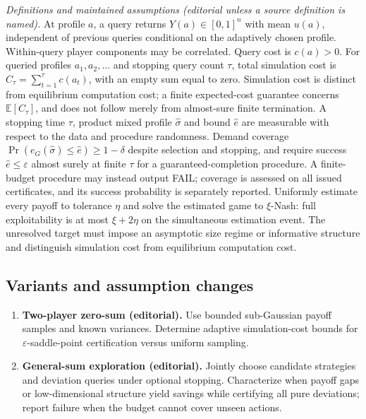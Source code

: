 \documentclass[11pt,a4paper]{article}
\newcommand{\E}{\mathbb E}
\begin{document}
\emph{Definitions and maintained assumptions (editorial unless a source definition is named).} At profile \(a\), a query returns \(Y(a)\in[0,1]^n\) with mean \(u(a)\), independent of previous queries conditional on the adaptively chosen profile. Within-query player components may be correlated. Query cost is \(c(a)>0\). For queried profiles \(a_1,a_2,\ldots\) and stopping query count \(\tau\), total simulation cost is \(C_\tau=\sum_{t=1}^{\tau}c(a_t)\), with an empty sum equal to zero. Simulation cost is distinct from equilibrium computation cost; a finite expected-cost guarantee concerns \(\E[C_\tau]\), and does not follow merely from almost-sure finite termination. A stopping time \(\tau\), product mixed profile \(\widehat\sigma\) and bound \(\widehat e\) are measurable with respect to the data and procedure randomness. Demand coverage \(\Pr(e_G(\widehat\sigma)\le\widehat e)\ge1-\delta\) despite selection and stopping, and require success \(\widehat e\le\varepsilon\) almost surely at finite \(\tau\) for a guaranteed-completion procedure. A finite-budget procedure may instead output FAIL; coverage is assessed on all issued certificates, and its success probability is separately reported. Uniformly estimate every payoff to tolerance \(\eta\) and solve the estimated game to \(\xi\)-Nash: full exploitability is at most \(\xi+2\eta\) on the simultaneous estimation event. The unresolved target must impose an asymptotic size regime or informative structure and distinguish simulation cost from equilibrium computation cost.
\subsection*{Variants and assumption changes}
\begin{enumerate}
\item \textbf{Two-player zero-sum (editorial).} Use bounded sub-Gaussian payoff samples and known variances. Determine adaptive simulation-cost bounds for \(\varepsilon\)-saddle-point certification versus uniform sampling.
\item \textbf{General-sum exploration (editorial).} Jointly choose candidate strategies and deviation queries under optional stopping. Characterize when payoff gaps or low-dimensional structure yield savings while certifying all pure deviations; report failure when the budget cannot cover unseen actions.
\end{enumerate}
\end{document}
